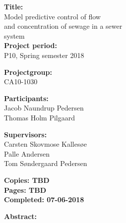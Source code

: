 \begin{minipage}[t]{0.48\textwidth}
\textbf{Title:} \\[5pt]\hspace*{2ex}
Model predictive control of flow   \\\hspace*{2ex}
and concentration of sewage in a sewer \\\hspace*{2ex}
system  \\

\textbf{Project period:} \\[5pt]\bigskip\hspace{2ex}
P10, Spring semester 2018

\textbf{Projectgroup:} \\[5pt]\bigskip\hspace{2ex}
CA10-1030

\textbf{Participants:} \\[5pt]\hspace*{2ex}
Jacob Naundrup Pedersen \\\hspace*{2ex}
Thomas Holm Pilgaard \\\hspace*{2ex}


\textbf{Supervisors:} \\[5pt]\hspace*{2ex}
Carsten Skovmose Kallesøe \\\hspace*{2ex}
Palle Andersen \\ \hspace*{2ex} %
Tom Søndergaard Pedersen \\\hspace*{2ex}


\vspace*{3.0cm}

\textbf{Copies: TBD} \\
\textbf{Pages: TBD}\\
\textbf{Completed: 07-06-2018}\\

\end{minipage}
\hfill
\begin{minipage}[t]{0.483\textwidth}
\textbf{Abstract:} \\[5pt]
\fbox{\parbox{7cm}{\bigskip\bigskip}}
\end{minipage}

\vfill

{\footnotesize\itshape}





